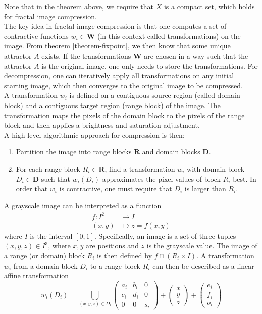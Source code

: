 Note that in the theorem above, we require that $X$ is a compact set, which holds for fractal image compression.
\\
The key idea in fractal image compression is that one computes a set of contractive functions $w_i \in \boldsymbol{W}$ (in this context called transformations) on the image.
From theorem \ref{theorem-fixpoint}, we then know that some unique attractor $A$ exists. If the transformations $\boldsymbol{W}$ are chosen in a way such that the attractor $A$ is the original image,
one only needs to store the transformations. For decompression, one can iteratively apply all transformations on any initial starting image, which then converges to the original image to be compressed.\\
A transformation $w_i$ is defined on a contiguous source region (called domain block) and a contiguous target region (range block) of the image. 
The transformation maps the pixels of the domain block to the pixels of the range block and then applies a brightness and saturation adjustment.\\
A high-level algorithmic approach for compression is then:
\begin{enumerate}
    \item Partition the image into range blocks $\boldsymbol{R}$ and domain blocks $\boldsymbol{D}$.
    \item For each range block $R_i \in \boldsymbol{R}$, find a transformation $w_i$ with domain block $D_i \in \boldsymbol{D}$ 
            such that $w_i(D_i)$ approximates the pixel values of block $R_i$ best. In order that $w_i$ is contractive, one must require that $D_i$ is larger than $R_i$.
\end{enumerate}
A grayscale image can be interpreted as a function
\begin{align*}
    f \colon I^2 &\to I\\
    (x,y) &\mapsto z = f(x,y)
\end{align*}
where $I$ is the interval $[0,1]$. Specifically, an image is a set of three-tuples $(x,y,z) \in I^3$, where $x,y$ are positions and $z$ is the grayscale value.
The image of a range (or domain) block $R_i$ is then defined by $f \cap (R_i \times I)$. 
A transformation $w_i$ from a domain block $D_i$ to a range block $R_i$ can then be described as a linear affine transformation
$$
w_i(D_i) = \bigcup_{(x,y,z) \in D_i} \begin{pmatrix} a_i & b_i & 0 \\ c_i & d_i & 0 \\ 0 & 0 & s_i \end{pmatrix} + \begin{pmatrix} x\\y\\z \end{pmatrix} + \begin{pmatrix} e_i\\f_i\\o_i \end{pmatrix}
$$
